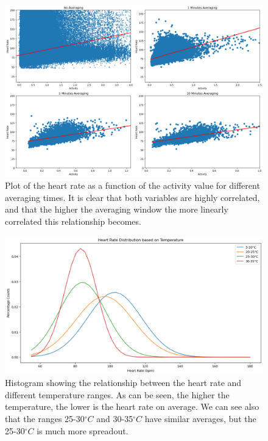 \documentclass[../main.tex]{subfiles}
\begin{document}
        \begin{figure}[h]
            \begin{center}
            \centering
            \includegraphics[width={\columnwidth}]{images/activity_hr_correlation.png}
            \caption{Plot of the heart rate as a function of the activity value for different averaging times. It is clear that both variables are highly correlated, and that the higher the averaging window the more linearly correlated this relationship becomes.}
            \label{fig:corr}
            \end{center}
        \end{figure}

        \begin{figure}[h]
            \begin{center}
            \centering
            \includegraphics[width={\columnwidth}]{images/temperature.png}
            \caption{Histogram showing the relationship between the heart rate and different temperature ranges. As can be seen, the higher the temperature, the lower is the heart rate on average. We can see also that the ranges 25-30$^\circ C$ and 30-35$^\circ C$ have similar averages, but the 25-30$^\circ C$ is much more spreadout.}
            \label{fig:temp}
            \end{center}
        \end{figure}
\end{document}
